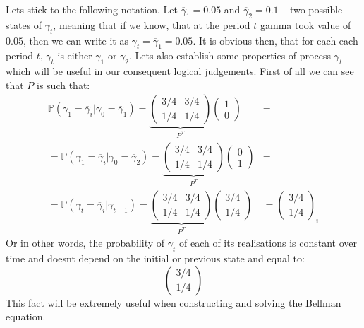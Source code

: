 \documentclass[11pt, oneside]{article}
\renewcommand{\P}{\mathbb{P}}
\newcommand{\g}{\gamma}
\renewcommand{\o}{\overline}
\begin{document}
Lets stick to the following notation. Let $ \o\g_{1} = 0.05$ and $ \o\g_{2} = 0.1 $ -- two possible states of $ \g_{t} $, meaning that if we know, that at the period $ t  $ gamma took value of $ 0.05 $, then we can write it as $ \g_{t} = \o{\g}_{1} = 0.05 $. It is obvious then, that for each each period $ t $, $ \g_{t} $ is either $ \o\g_{1} $ or $ \o\g_{2} $. Lets also establish some properties of process $ \g_{t} $ which will be useful in our consequent logical judgements. First of all we can see that $ P $ is such that:
\begin{align*}
\P(\g_{1} = \o\gamma_{i} | \g_{0} = \o\gamma_{1}) =  \underbrace{\begin{pmatrix}
	3/4 &3/4 \\ 1/4 & 1/4
\end{pmatrix}}_{P^{T}}\begin{pmatrix}
	1 \\ 0
\end{pmatrix} &= \\ 
= \P(\g_{1} = \o\gamma_{i} | \g_{0} = \o\gamma_{2}) = \underbrace{\begin{pmatrix}
3/4 &3/4 \\ 1/4 & 1/4
\end{pmatrix}}_{P^{T}}\begin{pmatrix}
0 \\ 1
\end{pmatrix} &=\\
= \P(\g_{t} = \o\gamma_{i} | \g_{t-1}) =  \underbrace{\begin{pmatrix}
	3/4 &3/4 \\ 1/4 & 1/4
\end{pmatrix}}_{P^{T}}\begin{pmatrix}
3/4 \\ 1/4
\end{pmatrix} &=\begin{pmatrix}
3/4 \\ 1/4
\end{pmatrix}_{i}
\end{align*}
Or in other words, the probability of $ \g_{t} $ of each of its realisations is constant over time and doesnt depend on the initial or previous state and equal to:
\[
\begin{pmatrix}
	3/4 \\ 1/4
\end{pmatrix}
\]
This fact will be extremely useful when constructing and solving the Bellman equation.
\end{document}
